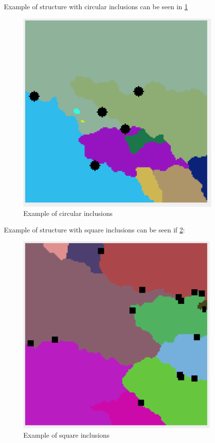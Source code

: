 \documentclass[a4paper, 11pt]{article}
\begin{document}
Example of structure with circular inclusions can be seen in \ref{CircularInclusionsExampleLabel}
\begin{figure}[H]
\centering
  \includegraphics[]{CircularInclusionsExample}
  \caption{Example of circular inclusions}
  \label{CircularInclusionsExampleLabel}
\end{figure}

Example of structure with square inclusions can be seen if \ref{SquareInclusionsExampleLabel}:
\begin{figure}[H]
\centering
  \includegraphics[]{SquareInclusionsExample}
  \caption{Example of square inclusions}
  \label{SquareInclusionsExampleLabel}
\end{figure}
\end{document}

